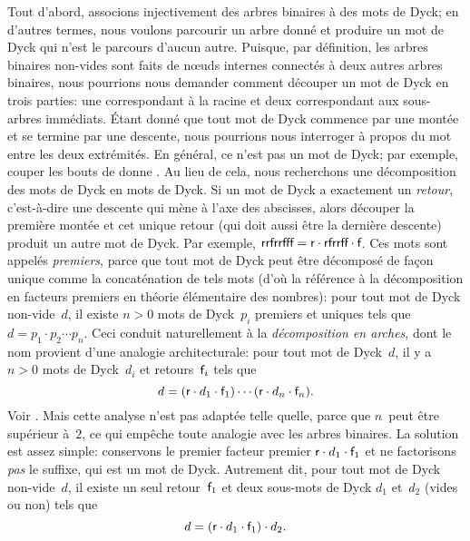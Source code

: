 Tout d'abord, associons injectivement des arbres binaires à des mots
de Dyck; en d'autres termes, nous voulons parcourir un arbre donné et
produire un mot de Dyck qui n'est le parcours d'aucun autre. Puisque,
par définition, les arbres binaires non-vides sont faits de nœuds
internes connectés à deux autres arbres binaires, nous pourrions nous
demander comment découper un mot de Dyck en trois parties: une
correspondant à la racine et deux correspondant aux sous-arbres
immédiats. Étant donné que tout mot de Dyck commence par une montée et
se termine par une descente, nous pourrions nous interroger à propos
du mot entre les deux extrémités. En général, ce n'est pas un mot de
Dyck; par exemple, couper les bouts de  donne
. Au lieu de cela, nous recherchons une décomposition des
mots de Dyck en mots de Dyck. Si un mot de Dyck a exactement un
\emph{retour}, c'est-à-dire une descente qui mène à l'axe des
abscisses, alors découper la première montée et cet unique retour (qui
doit aussi être la dernière descente) produit un autre mot de
Dyck. Par exemple, \(\textsf{rrfrrfff} = \textsf{r} \cdot \textsf{rfrrff} \cdot
\textsf{f}\). Ces mots sont appelés \emph{premiers}, parce que tout mot
de Dyck peut être décomposé de façon unique comme la concaténation de
tels mots (d'où la référence à la décomposition en facteurs premiers
en théorie élémentaire des nombres): pour tout mot de Dyck
non-vide~\(d\), il existe \({n > 0}\) mots de Dyck~\(p_i\) premiers et
uniques tels que \(d = p_1 \cdot p_2 \cdots p_n\). Ceci conduit
naturellement à la \emph{décomposition en arches}, dont le nom provient d'une
analogie architecturale: pour tout mot de Dyck~\(d\), il y a \({n >
  0}\) mots de Dyck~\(d_i\) et retours~\(\textsf{f}_i\) tels que
\begin{equation*}
d = (\textsf{r} \cdot d_1 \cdot \textsf{f}_1) \cdots (\textsf{r} \cdot d_n
\cdot \textsf{f}_n).
\end{equation*}
Voir \cite{PanayotopoulosSapounakis_1995,
  Lothaire_2005,FlajoletSedgewick_2009}. Mais cette analyse n'est pas
adaptée telle quelle, parce que \(n\)~peut être supérieur à~\(2\), ce
qui empêche toute analogie avec les arbres binaires. La solution est
assez simple: conservons le premier facteur premier \(\textsf{r} \cdot
d_1 \cdot \textsf{f}_1\) et ne factorisons \emph{pas} le suffixe, qui est
un mot de Dyck. Autrement dit, pour tout mot de Dyck non-vide~\(d\),
il existe un seul retour~\(\textsf{f}_1\) et deux sous-mots de Dyck
\(d_1\) et~\(d_2\) (vides ou non) tels que
\begin{equation*}
d = (\textsf{r} \cdot d_1 \cdot \textsf{f}_1) \cdot d_2.
\end{equation*}

